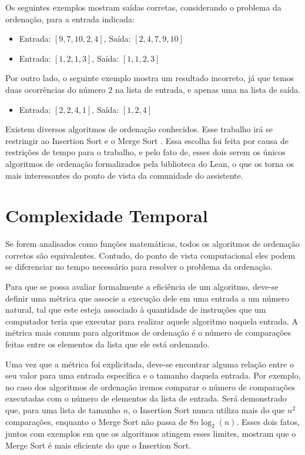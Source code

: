 \documentclass[12pt, oneside, a4paper,english,brazil]{abntex2}
\begin{document}
\qquad Os seguintes exemplos mostram sa\'idas corretas, considerando o problema da ordena\c{c}\~ao, para a
entrada indicada:

\begin{itemize}
  \item Entrada: $[9, 7, 10, 2, 4]$, Sa\'ida: $[2, 4, 7, 9, 10]$
  \item Entrada: $[1, 2, 1, 3]$, Sa\'ida: $[1, 1, 2, 3]$
\end{itemize}

\qquad Por outro lado, o seguinte exemplo mostra um resultado incorreto, j\'a que temos duas ocorr\^encias
do n\'umero $2$ na lista de entrada, e apenas uma na lista de sa\'ida.

\begin{itemize}
  \item Entrada: $[2, 2, 4, 1]$, Sa\'ida: $[1, 2, 4]$
\end{itemize}

\qquad Existem diversos algoritmos de ordena\c{c}\~ao conhecidos. Esse trabalho ir\'a se restringir ao
Insertion Sort e o Merge Sort \cite{1}. Essa escolha foi feita por causa de restri\c{c}\~oes de tempo para
o trabalho, e pelo fato de, esses dois serem os \'unicos algoritmos de ordena\c{c}\~ao
formalizados pela biblioteca do Lean, o que os torna os mais interessantes do ponto de vista
da comunidade do assistente.

\section{Complexidade Temporal}

\qquad Se forem analisados como fun\c{c}\~oes matem\'aticas, todos os algoritmos de ordena\c{c}\~ao corretos
s\~ao equivalentes. Contudo, do ponto de vista computacional eles podem se diferenciar no tempo necess\'ario
para resolver o problema da ordena\c{c}\~ao.

\qquad Para que se possa avaliar formalmente a efici\^encia de um algoritmo, deve-se definir uma m\'etrica
que associe a execu\c{c}\~ao dele em uma entrada a um n\'umero natural, tal que este esteja associado \`a
quantidade de instru\c{c}\~oes que um computador teria que executar para realizar aquele algoritmo naquela
entrada. A m\'etrica mais comum para algoritmos de ordena\c{c}\~ao \'e o n\'umero de compara\c{c}\~oes feitas
entre os elementos da lista que ele est\'a ordenando.

\qquad Uma vez que a m\'etrica foi explicitada, deve-se encontrar alguma rela\c{c}\~ao entre o seu valor para
uma entrada espec\'ifica e o tamanho daquela entrada. Por exemplo, no caso dos algoritmos de ordena\c{c}\~ao
iremos comparar o n\'umero de compara\c{c}\~oes executadas com o n\'umero de elementos da lista de entrada.
Ser\'a demonstrado que, para uma lista de tamanho $n$, o Insertion Sort nunca utiliza mais do que $n^{2}$
compara\c{c}\~oes, enquanto o Merge Sort n\~ao passa de $8 n \log_{2} (n)$. Esses dois fatos,
juntos com exemplos em que os algoritmos atingem esses limites, mostram que o Merge Sort \'e mais eficiente
do que o Insertion Sort.
\end{document}
